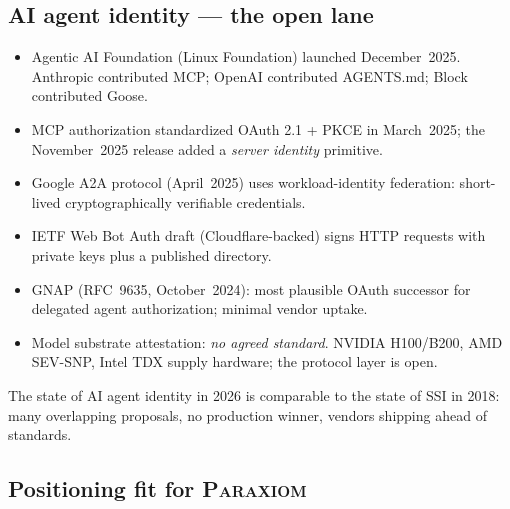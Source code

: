 \documentclass[11pt,a4paper,parskip=half-,DIV=12,headings=standardclasses]{scrartcl}
\theoremstyle{ncthm}
\theoremstyle{ncdef}
\newcommand{\paraxiom}{\textsc{Paraxiom}}
\begin{document}
\subsection{AI agent identity --- the open lane}

\begin{itemize}
\item Agentic AI Foundation (Linux Foundation) launched
  December~2025. Anthropic contributed MCP; OpenAI contributed
  AGENTS.md; Block contributed Goose.
\item MCP authorization standardized OAuth 2.1 + PKCE in
  March~2025; the November~2025 release added a \emph{server
  identity} primitive.
\item Google A2A protocol (April~2025) uses workload-identity
  federation: short-lived cryptographically verifiable credentials.
\item IETF Web Bot Auth draft (Cloudflare-backed) signs HTTP requests
  with private keys plus a published directory.
\item GNAP (RFC~9635, October~2024): most plausible OAuth successor
  for delegated agent authorization; minimal vendor uptake.
\item Model substrate attestation: \emph{no agreed standard}. NVIDIA
  H100/B200, AMD SEV-SNP, Intel TDX supply hardware; the protocol
  layer is open.
\end{itemize}

The state of AI agent identity in 2026 is comparable to the state of
SSI in 2018: many overlapping proposals, no production winner, vendors
shipping ahead of standards.

\subsection{Positioning fit for \paraxiom}
\end{document}

